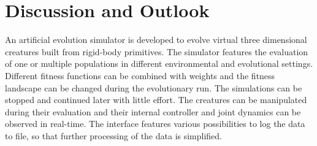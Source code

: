 \documentclass[main]{subfiles}
\begin{document}
\setcounter{chapter}{4}

\chapter{Discussion and Outlook} %

\label{Chapter\thechapter} %

%
An artificial evolution simulator is developed to evolve virtual three dimensional creatures built from rigid-body primitives. %
%
The simulator features the evaluation of one or multiple populations in different environmental and evolutional settings. %
%
Different fitness functions can be combined with weights and the fitness landscape can be changed during the evolutionary run. %
%
The simulations can be stopped and continued later with little effort. %
%
The creatures can be manipulated during their evaluation and their internal controller and joint dynamics can be observed in real-time. %
%
The interface features various possibilities to log the data to file, so that further processing of the data is simplified. 
\end{document}
